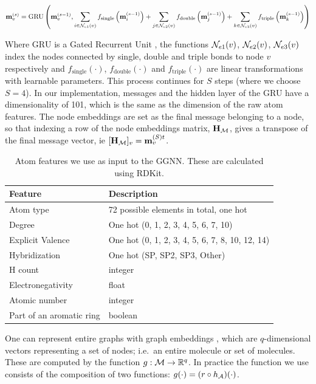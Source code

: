 \begin{align}
	{\mathbf{m}}_v^{(s)} = \textrm{GRU}\left( 
					{\mathbf{m}}_v^{(s - 1)},  
						\sum_{i \in \mathcal{N}_{e1}(v)} f_\textrm{single}\left({\mathbf{m}}_i^{(s - 1)}\right) +
						\sum_{j \in \mathcal{N}_{e2}(v)} f_\textrm{double}\left({\mathbf{m}}_j^{(s - 1)}\right) +
						\sum_{k \in \mathcal{N}_{e3}(v)} f_\textrm{triple}\left({\mathbf{m}}_k^{(s - 1)}\right)
					\right)
\end{align}

Where $\textrm{GRU}$ is a Gated Recurrent Unit \citep{Cho2014-xt}, the functions $\mathcal{N}_{e1}(v)$, $\mathcal{N}_{e2}(v)$, $\mathcal{N}_{e3}(v)$ index the nodes connected by single, double and triple bonds to node $v$ respectively and $f_\textrm{single}(\cdot)$, $f_\textrm{double}(\cdot)$ and $f_\textrm{triple}(\cdot)$ are linear transformations with learnable parameters.
This process continues for $S$ steps (where we choose $S=4$). In our implementation, messages and the hidden layer of the GRU have a dimensionality of 101, which is the same as the dimension of the raw atom features.
The node embeddings are set as the final message belonging to a node, so that indexing a row of the node embeddings matrix, ${\mathbf{H}}_{{\mathcal{M}}}$, gives a transpose of the final message vector, ie $[{\mathbf{H}}_{{\mathcal{M}}}]_v = {\mathbf{m}}_v^{(S)t}$.

\begin{table}
  \caption{Atom features we use as input to the GGNN. These are calculated using RDKit.}
  \label{table:atom-features}
  \centering
  \begin{tabular}{ll}
    \toprule
    Feature     & Description      \\
    \midrule
    Atom type & 72 possible elements in total, one hot  \\
    Degree     & One hot (0,   1,   2,   3,   4,   5,   6,   7,  10)  \\
    Explicit Valence     & One hot   (0,   1,   2,   3,   4,   5,   6,   7,   8,  10,  12,  14)    \\
    Hybridization & One hot (SP, SP2, SP3, Other) \\
    H count & integer \\
    Electronegativity & float \\
    Atomic number & integer \\
    Part of an aromatic ring & boolean\\
    \bottomrule
  \end{tabular}
\end{table}


One can represent entire graphs with graph embeddings \citep{li2018learning,Johnson2017-pd}, which are $q$-dimensional vectors representing a set of nodes; i.e.\ an entire molecule or set of molecules.
These are computed by the function $g: {\mathcal{M}} \to \mathbb{R}^{q}$. 
In practice the function we use consists of the composition of two functions: $g(\cdot) = (r \circ h_{{\mathcal{A}}})(\cdot)$.

